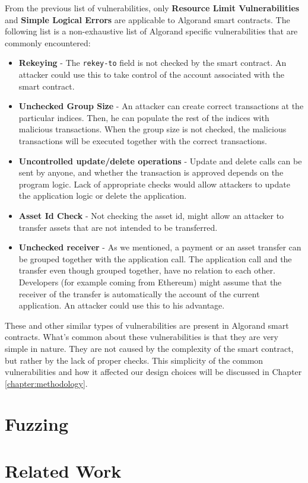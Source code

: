 From the previous list of vulnerabilities, only \textbf{Resource Limit Vulnerabilities} and \textbf{Simple Logical Errors} are applicable to Algorand smart contracts. The following list is a non-exhaustive list of Algorand specific vulnerabilities that are commonly encountered:
\begin{itemize}
    \item \textbf{Rekeying} - The \texttt{rekey-to} field is not checked by the smart contract. An attacker could use this to take control of the account associated with the smart contract.
    \item \textbf{Unchecked Group Size} - An attacker can create correct transactions at the particular indices. Then, he can populate the rest of the indices with malicious transactions. When the group size is not checked, the malicious transactions will be executed together with the correct transactions.
    \item \textbf{Uncontrolled update/delete operations} - Update and delete calls can be sent by anyone, and whether the transaction is approved depends on the program logic. Lack of appropriate checks would allow attackers to update the application logic or delete the application.
    \item \textbf{Asset Id Check} - Not checking the asset id, might allow an attacker to transfer assets that are not intended to be transferred.
    \item \textbf{Unchecked receiver} - As we mentioned, a payment or an asset transfer can be grouped together with the application call. The application call and the transfer even though grouped together, have no relation to each other. Developers (for example coming from Ethereum) might assume that the receiver of the transfer is automatically the account of the current application. An attacker could use this to his advantage.
\end{itemize}

These and other similar types of vulnerabilities are present in Algorand smart contracts.
What's common about these vulnerabilities is that they are very simple in nature.
They are not caused by the complexity of the smart contract, but rather by the lack of proper checks.
This simplicity of the common vulnerabilities and how it affected our design choices will be discussed in Chapter \ref{chapter:methodology}.

\section{Fuzzing} \label{section:fuzzing}

\section{Related Work}
